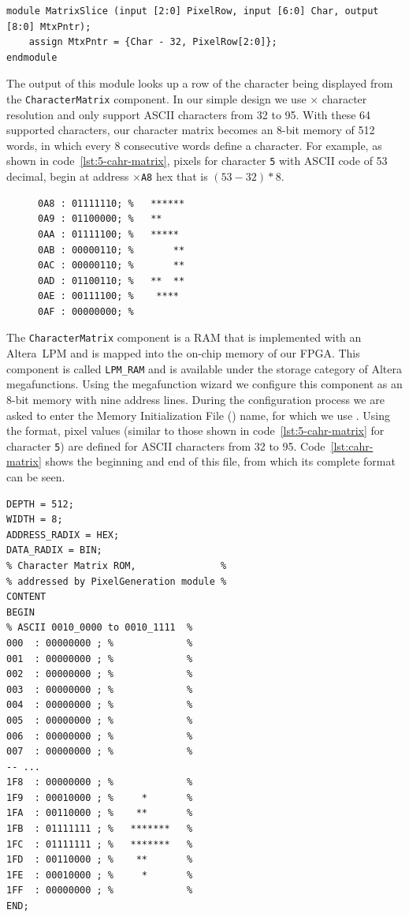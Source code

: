 \documentclass[12pt, logo=tehranDLDL/ut]{tehranDLDL}
\begin{document}
\begin{lstlisting}[caption={\lstinline{MatrixSlice} Verilog code\label{lst:matrix-slice}}]
module MatrixSlice (input [2:0] PixelRow, input [6:0] Char, output [8:0] MtxPntr);
    assign MtxPntr = {Char - 32, PixelRow[2:0]}; 
endmodule
\end{lstlisting}

The output of this module looks up a row of the character being displayed from the \lstinline{CharacterMatrix} component. In our simple design we use $\times$ character resolution and only support ASCII characters from 32 to 95. With these 64 supported characters, our character matrix becomes an 8-bit memory of 512 words, in which every 8 consecutive words define a character.
For example, as shown in code~\ref{lst:5-cahr-matrix}, pixels for character \texttt{5} with ASCII code of 53 decimal, begin at address \texttt{$\times$A8} hex that is $(53-32)*8$.

\begin{figure}
\begin{lstlisting}[caption={Character matrix for character \texttt{5}\label{lst:5-cahr-matrix}},language={mif}]
0A8 : 01111110; %   ******
0A9 : 01100000; %   **
0AA : 01111100; %   *****
0AB : 00000110; %       **
0AC : 00000110; %       **
0AD : 01100110; %   **  **
0AE : 00111100; %    ****
0AF : 00000000; %
\end{lstlisting}
\end{figure}

The \lstinline{CharacterMatrix} component is a RAM that is implemented with an Altera~LPM and is mapped into the on-chip memory of our FPGA. This component is called \lstinline{LPM_RAM} and is available under the storage category of Altera megafunctions. Using the megafunction wizard we configure this component as an 8-bit memory with nine address lines. During the configuration process we are asked to enter the Memory Initialization File () name, for which we use . Using the  format, pixel values (similar to those shown in code~\ref{lst:5-cahr-matrix} for character \texttt{5}) are defined for ASCII characters from 32 to 95. Code~\ref{lst:cahr-matrix} shows the beginning and end of this file, from which its complete format can be seen.

\begin{lstlisting}[caption={Character matrix \texttt{mif} file\label{lst:cahr-matrix}},language={mif}]
DEPTH = 512;
WIDTH = 8;
ADDRESS_RADIX = HEX;
DATA_RADIX = BIN;
% Character Matrix ROM,               %
% addressed by PixelGeneration module %
CONTENT
BEGIN
% ASCII 0010_0000 to 0010_1111  %
000  : 00000000 ; %             %
001  : 00000000 ; %             %
002  : 00000000 ; %             %
003  : 00000000 ; %             %
004  : 00000000 ; %             %
005  : 00000000 ; %             %
006  : 00000000 ; %             %
007  : 00000000 ; %             %
-- ...
1F8  : 00000000 ; %             %
1F9  : 00010000 ; %     *       %
1FA  : 00110000 ; %    **       %
1FB  : 01111111 ; %   *******   %
1FC  : 01111111 ; %   *******   %
1FD  : 00110000 ; %    **       %
1FE  : 00010000 ; %     *       %
1FF  : 00000000 ; %             %
END;
\end{lstlisting}
\end{document}
